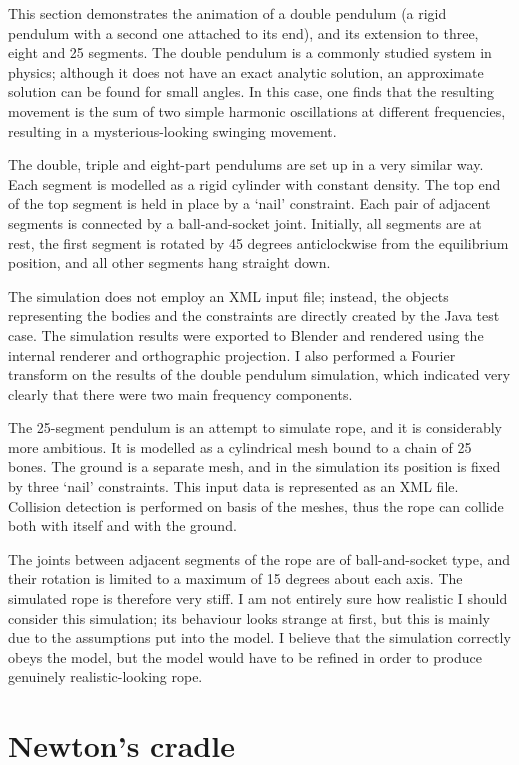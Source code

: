 This section demonstrates the animation of a double pendulum (a rigid pendulum with a second one
attached to its end), and its extension to three, eight and 25 segments. The double pendulum is
a commonly studied system in physics; although it does not have an exact analytic solution, an
approximate solution can be found for small angles. In this case, one finds that the resulting
movement is the sum of two simple harmonic oscillations at different frequencies, resulting in
a mysterious-looking swinging movement.

The double, triple and eight-part pendulums are set up in a very similar way. Each segment is
modelled as a rigid cylinder with constant density. The top end of the top segment is held in
place by a `nail' constraint. Each pair of adjacent segments is connected by a ball-and-socket
joint. Initially, all segments are at rest, the first segment is rotated by 45 degrees
anticlockwise from the equilibrium position, and all other segments hang straight down.

The simulation does not employ an XML input file; instead, the objects representing the bodies
and the constraints are directly created by the Java test case. The simulation results were
exported to Blender and rendered using the internal renderer and orthographic projection.
I also performed a Fourier transform on the results of the double pendulum simulation, which
indicated very clearly that there were two main frequency components.

The 25-segment pendulum is an attempt to simulate rope, and it is considerably more ambitious.
It is modelled as a cylindrical mesh bound to a chain of 25 bones. The ground is a separate mesh,
and in the simulation its position is fixed by three `nail' constraints. This input data is
represented as an XML file. Collision detection is performed on basis of the meshes, thus the
rope can collide both with itself and with the ground.

The joints between adjacent segments of the rope are of ball-and-socket type, and their rotation
is limited to a maximum of 15 degrees about each axis. The si\-mu\-la\-ted rope is therefore very
stiff. I am not entirely sure how realistic I should consider this simulation; its behaviour looks
strange at first, but this is mainly due to the assumptions put into the model. I believe that
the simulation correctly obeys the model, but the model would have to be refined in order
to produce genuinely realistic-looking rope.

\section{Newton's cradle}

